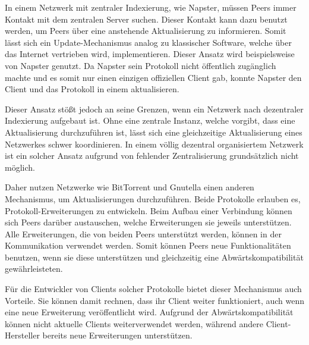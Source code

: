 In einem Netzwerk mit zentraler Indexierung, wie Napster, müssen Peers immer Kontakt mit dem zentralen Server suchen. Dieser Kontakt kann dazu benutzt werden, um Peers über eine anstehende Aktualisierung zu informieren. Somit lässt sich ein Update-Mechanismus analog zu klassischer Software, welche über das Internet vertrieben wird, implementieren. Dieser Ansatz wird beispielsweise von Napster genutzt. Da Napster sein Protokoll nicht öffentlich zugänglich machte und es somit nur einen einzigen offiziellen Client gab, konnte Napster den Client und das Protokoll in einem aktualisieren. 

Dieser Ansatz stößt jedoch an seine Grenzen, wenn ein Netzwerk nach dezentraler Indexierung aufgebaut ist. Ohne eine zentrale Instanz, welche vorgibt, dass eine Aktualisierung durchzuführen ist, lässt sich eine gleichzeitige Aktualisierung eines Netzwerkes schwer koordinieren. In einem völlig dezentral organisiertem Netzwerk ist ein solcher Ansatz aufgrund von fehlender Zentralisierung grundsätzlich nicht möglich. 

Daher nutzen Netzwerke wie BitTorrent und Gnutella einen anderen Mechanismus, um Aktualisierungen durchzuführen. Beide Protokolle erlauben es, Protokoll-Er\-weiterung\-en zu entwickeln. Beim Aufbau einer Verbindung können sich Peers darüber austauschen, welche Erweiterungen sie jeweils unterstützen. Alle Erweiterungen, die von beiden Peers unterstützt werden, können in der Kommunikation verwendet werden. Somit können Peers neue Funktionalitäten benutzen, wenn sie diese unterstützen und gleichzeitig eine Abwärtskompatibilität gewährleisteten. 

Für die Entwickler von Clients solcher Protokolle bietet dieser Mechanismus auch Vorteile. Sie können damit rechnen, dass ihr Client weiter funktioniert, auch wenn eine neue Erweiterung veröffentlicht wird. Aufgrund der Abwärtskompatibilität können nicht aktuelle Clients weiterverwendet werden, während andere Client-Hersteller bereits neue Erweiterungen unterstützen. 